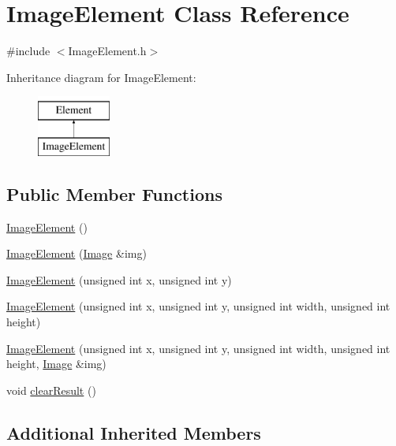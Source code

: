 \hypertarget{class_image_element}{\section{Image\-Element Class Reference}
\label{class_image_element}
}


{\ttfamily \#include $<$Image\-Element.\-h$>$}

Inheritance diagram for Image\-Element\-:\begin{figure}[H]
\begin{center}
\leavevmode
\includegraphics[height=2.000000cm]{class_image_element}
\end{center}
\end{figure}
\subsection*{Public Member Functions}
\begin{DoxyCompactItemize}
\item 
\hyperlink{class_image_element_a74aff4a808a295c0557f9c4dbedbc50a}{Image\-Element} ()
\item 
\hyperlink{class_image_element_aba9605d67c75b2802a45e93a4b0cff5d}{Image\-Element} (\hyperlink{class_image}{Image} \&img)
\item 
\hyperlink{class_image_element_a2a1f13235bc96229d3257212b3c62c79}{Image\-Element} (unsigned int x, unsigned int y)
\item 
\hyperlink{class_image_element_a9661aca27d32e6b9252dbbe45417f1bf}{Image\-Element} (unsigned int x, unsigned int y, unsigned int width, unsigned int height)
\item 
\hyperlink{class_image_element_a63993109c5c8e49f95c25ca13a887f1e}{Image\-Element} (unsigned int x, unsigned int y, unsigned int width, unsigned int height, \hyperlink{class_image}{Image} \&img)
\item 
void \hyperlink{class_image_element_aa785ef26786dc59b0e66a71e465b3e31}{clear\-Result} ()
\end{DoxyCompactItemize}
\subsection*{Additional Inherited Members}


